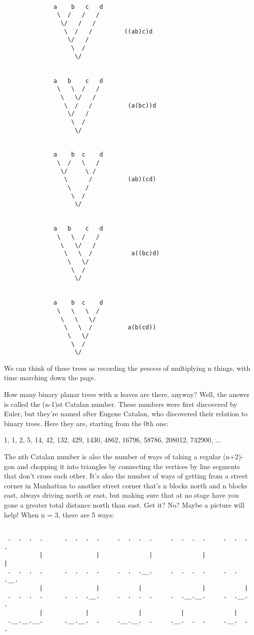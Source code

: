 \begin{verbatim}

              a    b   c   d
               \  /   /   /
                \/   /   /
                 \  /   /         ((ab)c)d
                  \/   /
                   \  /
                    \/


              a   b    c   d
               \   \  /   /
                \   \/   /
                 \  /   /          (a(bc))d
                  \/   /
                   \  /
                    \/


              a    b  c    d
               \  /   \   /
                \/     \ /
                 \      /          (ab)(cd)
                  \    /
                   \  /
                    \/


              a   b    c   d
               \   \  /   /
                \   \/   /
                 \   \  /           a((bc)d)
                  \   \/
                   \  /
                    \/


              a    b  c    d
               \   \   \  /
                \   \   \/
                 \   \  /          a(b(cd))
                  \   \/
                   \  /
                    \/

\end{verbatim}
    
We can think of these trees as recording the \emph{process} of multiplying 
n things, with time marching down the page. 

How many binary planar trees with n leaves are there, anyway?  Well,
the answer is called the (n-1)st Catalan number.  These numbers
were first discovered by Euler, but they're named after Eugene Catalan, 
who discovered their relation to binary trees.  Here they are, starting 
from the 0th one:

1, 1, 2, 5, 14, 42, 132, 429, 1430, 4862, 16796, 58786, 208012, 742900, ...

The nth Catalan number is also the number of ways of taking a regular
(n+2)-gon and chopping it into triangles by connecting the vertices by
line segments that don't cross each other.   It's also the number of ways
of getting from a street corner in Manhattan to another street corner
that's n blocks north and n blocks east, always driving north or east, 
but making sure that at no stage have you gone a greater total distance 
north than east.  Get it?  No?  Maybe a picture will help!  When n = 3, 
there are 5 ways:


\begin{verbatim}

 .  .  .  .      .  .  .  .     .  .  .  .     .  .  .  .     .  .  .  .
          |               |              |              |              |
 .  .  .  .      .  .  .  .     .  .  .__.     .  .  .  .     .  .  .__.
          |               |           |                 |           |
 .  .  .  .      .  .  .__.     .  .  .  .     .  .__.__.     .  .__.  .
          |            |              |           |              |
 .__.__.__.      .__.__.  .     .__.__.  .     .__.  .  .     .__.  .  .
\end{verbatim}
    

